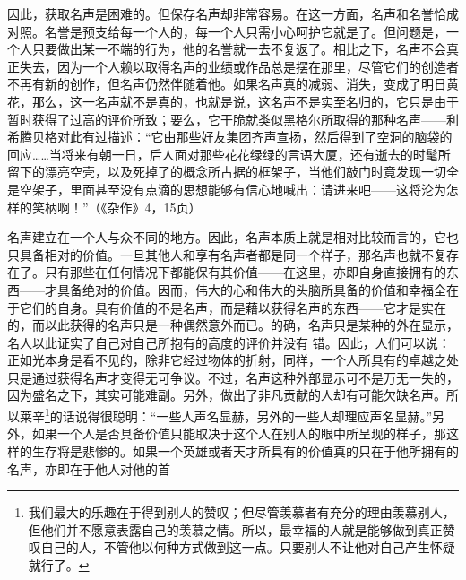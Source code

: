\documentclass[12pt,oneside]{book}
\begin{document}
因此，获取名声是困难的。但保存名声却非常容易。在这一方面，名声和名誉恰成对照。名誉是预支给每一个人的，每一个人只需小心呵护它就是了。但问题是，一个人只要做出某一不端的行为，他的名誉就一去不复返了。相比之下，名声不会真正失去，因为一个人赖以取得名声的业绩或作品总是摆在那里，尽管它们的创造者不再有新的创作，但名声仍然伴随着他。如果名声真的减弱、消失，变成了明日黄花，那么，这一名声就不是真的，也就是说，这名声不是实至名归的，它只是由于暂时获得了过高的评价所致；要么，它干脆就类似黑格尔所取得的那种名声——利希腾贝格对此有过描述：“它由那些好友集团齐声宣扬，然后得到了空洞的脑袋的回应……当将来有朝一日，后人面对那些花花绿绿的言语大厦，还有逝去的时髦所留下的漂亮空壳，以及死掉了的概念所占据的框架子，当他们敲门时竟发现一切全是空架子，里面甚至没有点滴的思想能够有信心地喊出：请进来吧——这将沦为怎样的笑柄啊！”（《杂作》4，15页） 

名声建立在一个人与众不同的地方。因此，名声本质上就是相对比较而言的，它也只具备相对的价值。一旦其他人和享有名声者都是同一个样子，那名声也就不复存在了。只有那些在任何情况下都能保有其价值——在这里，亦即自身直接拥有的东西——才具备绝对的价值。因而，伟大的心和伟大的头脑所具备的价值和幸福全在于它们的自身。具有价值的不是名声，而是藉以获得名声的东西——它才是实在的，而以此获得的名声只是一种偶然意外而已。的确，名声只是某种的外在显示，名人以此证实了自己对自己所抱有的高度的评价并没有
错。因此，人们可以说：正如光本身是看不见的，除非它经过物体的折射，同样，一个人所具有的卓越之处只是通过获得名声才变得无可争议。不过，名声这种外部显示可不是万无一失的，因为盛名之下，其实可能难副。另外，做出了非凡贡献的人却有可能欠缺名声。所以莱辛\footnote{我们最大的乐趣在于得到别人的赞叹；但尽管羡慕者有充分的理由羡慕别人，但他们并不愿意表露自己的羡慕之情。所以，最幸福的人就是能够做到真正赞叹自己的人，不管他以何种方式做到这一点。只要别人不让他对自己产生怀疑就行了。}的话说得很聪明：“一些人声名显赫，另外的一些人却理应声名显赫。”另外，如果一个人是否具备价值只能取决于这个人在别人的眼中所呈现的样子，那这样的生存将是悲惨的。如果一个英雄或者天才所具有的价值真的只在于他所拥有的名声，亦即在于他人对他的首
\end{document}
